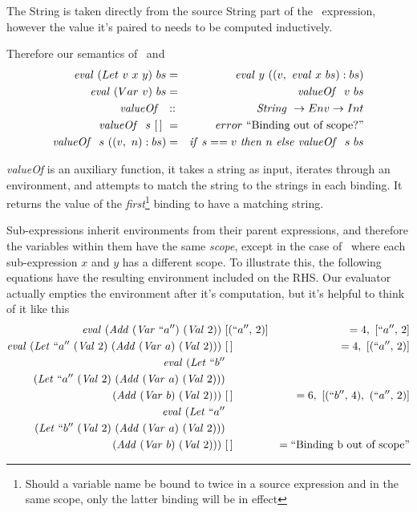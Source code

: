 \documentclass {article}
\begin{document}
The String is taken directly from the source
String part of the \leet\ expression,
however the value it's paired to 
needs to be computed inductively.

\newcommand{\valof}{\mathit{valueOf\ }}
Therefore our semantics of \leet\ and \var\
\begin{eqnarray*}
\evalf  (Let\ v\ x\ y)\ bs &=& \evalf  y\ ((v,\ \evalf  x\ bs):bs) \\
\evalf  (Var\ v)\ bs	  &=&   \valof\ v\ bs  \\
\valof\ &::& \String \rightarrow Env \rightarrow Int \\
\valof\ s\ [\, ]\ &=& error\ \mbox{``Binding out of scope?''} \\
\valof\ s\ ((v,\ n):bs) &=& \ifff s == v\ \tthen n\ \eelse \valof\ s\ bs
\end{eqnarray*}

\textit{valueOf} is an auxiliary function,
it takes a string as input, iterates through an
environment, and attempts to match
the string to the strings in each binding.
It returns the value of the \emph{first}\footnote{
Should a variable name be bound to twice in a 
source expression and in the same scope,
only the latter binding will
be in effect} binding
to have a matching string. 

Sub-expressions inherit environments from their parent expressions,
and therefore the variables within them have the same \emph{scope},
except in the case of \leet\ where each sub-expression $x$ and $y$
has a different scope. 
To illustrate this, the following equations
have the resulting environment included on the RHS.
Our evaluator actually empties the environment 
after it's computation, 
but it's helpful to think of it like this
\begin{align}
\mathit{eval\ }  (\mathit{Add\ } (\mathit{Var\ } ``a'')\ (\mathit{Val\ } 2))\ &[(``a'',\, 2)] 
			&= 4,\ [``a'',\, 2] \nonumber \\
\mathit{eval\ }  (\mathit{Let\ } ``a''\ (\mathit{Val\ } 2)\ (\mathit{Add\ } (\mathit{Var\ } a)\ (\mathit{Val\ } 2))  )\ &[\, ] 
		&= 4,\ [(``a'',\, 2)] \nonumber \\ 
\mathit{eval\ }  (\mathit{Let\ } ``b'' \nonumber \\
		(\mathit{Let\ } ``a''\ (\mathit{Val\ } 2) \
			 (\mathit{Add\ } (\mathit{Var\ } a)\ (\mathit{Val\ } 2))  ) \nonumber \\
		(\mathit{Add\ } (\mathit{Var\ } b)\ (\mathit{Val\ } 2)))\ &[\, ] 
		&= 6,\ [(``b'',\, 4),\ (``a'',\, 2)] \label{egletlet1} \\ 
\mathit{eval\ }  (\mathit{Let\ } ``a'' \nonumber \\
		(\mathit{Let\ } ``b''\ (\mathit{Val\ } 2) \
			 (\mathit{Add\ } (\mathit{Var\ } a)\ (\mathit{Val\ } 2))  ) \nonumber \\
		(\mathit{Add\ } (\mathit{Var\ } b)\ (\mathit{Val\ } 2)))\ &[\, ] 
		&= \mbox{``Binding b out of scope''} \label{egletlet2} \nonumber \\
\end{align}
\end{document}
